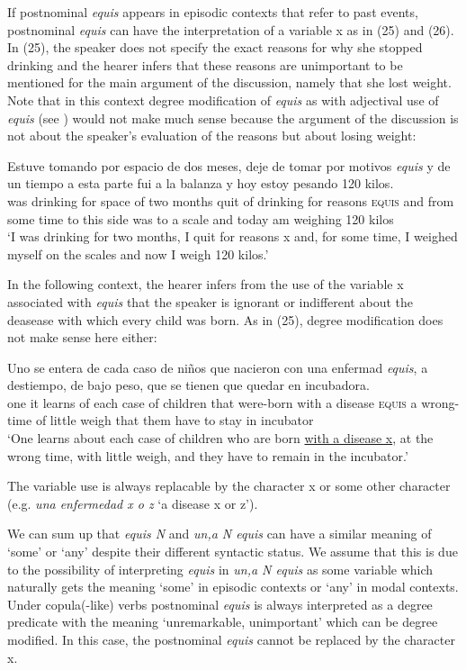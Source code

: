 \documentclass[output=paper
,modfonts
,nonflat]{langsci/langscibook}
\begin{document}
If postnominal \textit{equis} appears in episodic contexts that refer to past events, postnominal \textit{equis} can have the interpretation of a variable x as in (25) and (26). In (25), the speaker does not specify the exact reasons for why she stopped drinking and the hearer infers that these reasons are unimportant to be mentioned for the main argument of the discussion, namely that she lost weight. Note that in this context degree modification of \textit{equis} as with adjectival use of \textit{equis} (see ) would not make much sense because the argument of the discussion is not about the speaker's evaluation of the reasons but about losing weight:

\ea
\gll  Estuve tomando por espacio de dos meses, deje de tomar por motivos \textit{equis} y de un tiempo a esta parte fui a la balanza y hoy estoy pesando 120 kilos.\\
was drinking for space of two months quit of drinking for reasons \textsc{equis} and from some time to this side was to a scale and today am weighing 120 kilos\\
\glt ‘I was drinking for two months, I quit for reasons x and, for some time, I weighed myself on the scales and now I weigh 120 kilos.’
\z

In the following context, the hearer infers from the use of the variable x associated with \textit{equis} that the speaker is ignorant or indifferent about the deasease with which every child was born. As in (25), degree modification does not make sense here either:

\ea
\gll  Uno se entera de cada caso de niños que nacieron con una enfermad \textit{equis}, a destiempo, de bajo peso, que se tienen que quedar en incubadora.\\
one it learns of each case of children that were-born with a disease \textsc{equis} a wrong-time of little weigh that them have to stay in incubator\\
\glt ‘One learns about each case of children who are born \underline{with a disease x}, at the wrong time, with little weigh, and they have to remain in the incubator.’
\z

The variable use is always replacable by the character x or some other character (e.g. \textit{una enfermedad x o z} ‘a disease x or z’).

We can sum up that \textit{equis N} and \textit{un,a N equis} can have a similar meaning of ‘some’ or ‘any’ despite their different syntactic status. We assume that this is due to the possibility of interpreting \textit{equis} in \textit{un,a N equis} as some variable which naturally gets the meaning ‘some’ in episodic contexts or ‘any’ in modal contexts. Under copula(-like) verbs postnominal \textit{equis} is always interpreted as a degree predicate with the meaning ‘unremarkable, unimportant’ which can be degree modified. In this case, the postnominal \textit{equis} cannot be replaced by the character x.
\end{document}
